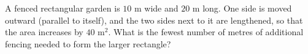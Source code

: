 A fenced rectangular garden is $10$ m wide and $20$ m long. One side is moved outward (parallel to itself), and the two sides next to it are lengthened, so that the area increases by $40$ m$^2$. What is the fewest number of metres of additional fencing needed to form the larger rectangle?
